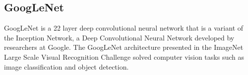 
\subsection*{GoogLeNet}

GoogLeNet is a 22 layer deep convolutional neural network that is a variant of the Inception Network, a Deep
Convolutional Neural Network developed by researchers at Google. The GoogLeNet architecture presented in the ImageNet
Large Scale Visual Recognition Challenge solved computer vision tasks such as image classification and object detection.

